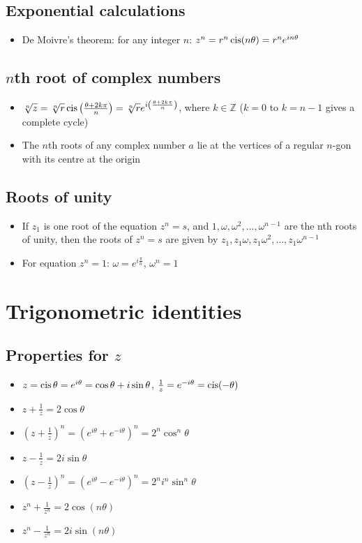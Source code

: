 \subsection{Exponential calculations}
\begin{itemize}
    \item De Moivre's theorem: for any integer $n$: $z^n = r^n\operatorname{cis}(n\theta)=r^ne^{in\theta}$
\end{itemize}

\subsection{$n$th root of complex numbers}
\begin{itemize}
    \item $\sqrt[n]{z}=\sqrt[n]{r}\operatorname{cis}\left(\frac{\theta+2k\pi}{n}\right)=\sqrt[n]{r}e^{i\left(\frac{\theta+2k\pi}{n}\right)}$, where $k\in \mathbb{Z}$ ($k=0$ to $k=n-1$ gives a complete cycle)
    \item The $n$th roots of any complex number $a$ lie at the vertices of a regular $n$-gon with its centre at the origin
\end{itemize}

\subsection{Roots of unity}
\begin{itemize}
    \item If $z_1$ is one root of the equation $z^n=s$, and $1,\omega,\omega^2,\dots,\omega^{n-1}$ are the nth roots of unity, then the roots of $z^n=s$ are given by $z_1, z_1\omega, z_1\omega^2, \dots, z_1\omega^{n-1}$
    \item For equation $z^n=1$: $\omega=e^{i\frac{\pi}{n}}$, $\omega^n=1$
\end{itemize}


\section{Trigonometric identities}
\subsection{Properties for $z$}
\begin{itemize}
    \item $z=\operatorname{cis}\theta=e^{i\theta}=\cos\theta + i\sin\theta$, $\frac{1}{z} = e^{-i\theta} = \operatorname{cis} (-\theta)$
    \item $z+\frac{1}{z}=2\cos\theta$
    \item $\left(z+\frac{1}{z}\right)^n=\left(e^{i\theta}+e^{-i\theta}\right)^n=2^n\cos^n\theta$
    \item $z-\frac{1}{z}=2i\sin\theta$
    \item $\left(z-\frac{1}{z}\right)^n=\left(e^{i\theta}-e^{-i\theta}\right)^n=2^n i^n \sin^n\theta$
    \item $z^n+\frac{1}{z^n}=2\cos (n\theta)$
    \item $z^n-\frac{1}{z^n}=2i\sin (n\theta)$
\end{itemize}
